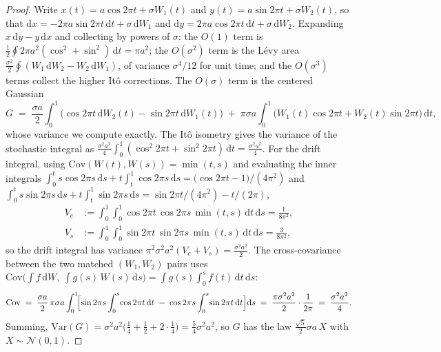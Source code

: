 \documentclass[11pt,a4paper]{article}
\theoremstyle{plain}
\theoremstyle{definition}
\theoremstyle{remark}
\begin{document}
\begin{proof}
Write $x(t)=a\cos 2\pi t+\sigma W_1(t)$ and $y(t)=a\sin 2\pi
t+\sigma W_2(t)$, so that $\mathrm{d}x=-2\pi a\sin 2\pi t\,
\mathrm{d}t+\sigma\,\mathrm{d}W_1$ and $\mathrm{d}y=2\pi a\cos
2\pi t\,\mathrm{d}t+\sigma\,\mathrm{d}W_2$. Expanding
$x\,\mathrm{d}y-y\,\mathrm{d}x$ and collecting by powers of
$\sigma$: the $O(1)$ term is
$\tfrac12\oint 2\pi a^{2}(\cos^{2}+\sin^{2})\,\mathrm{d}t=\pi
a^{2}$; the $O(\sigma^{2})$ term is the L\'evy area
$\tfrac{\sigma^{2}}{2}\oint(W_1\,\mathrm{d}W_2-W_2\,\mathrm{d}W_1)
$, of variance $\sigma^{4}/12$ for unit time; and the
$O(\sigma^{3})$ terms collect the higher It\^o corrections. The
$O(\sigma)$ term is the centered Gaussian
\[
  G \;=\; \frac{\sigma a}{2}\int_0^1\!\bigl(\cos 2\pi t\,
  \mathrm{d}W_2(t)-\sin 2\pi t\,\mathrm{d}W_1(t)\bigr)
  \;+\;\pi\sigma a\int_0^1\!\bigl(W_1(t)\cos 2\pi t+W_2(t)
  \sin 2\pi t\bigr)\,\mathrm{d}t,
\]
whose variance we compute exactly. The It\^o isometry gives the
variance of the stochastic integral as
$\tfrac{\sigma^{2}a^{2}}{4}\int_0^1(\cos^{2}2\pi t+\sin^{2}2\pi
t)\,\mathrm{d}t=\tfrac{\sigma^{2}a^{2}}{4}$. For the drift
integral, using $\mathrm{Cov}(W(t),W(s))=\min(t,s)$ and evaluating
the inner integrals $\int_0^t s\cos 2\pi s\,\mathrm{d}s
+t\int_t^1\cos 2\pi s\,\mathrm{d}s=\bigl(\cos 2\pi t-1\bigr)/
(4\pi^{2})$ and $\int_0^t s\sin 2\pi s\,\mathrm{d}s
+t\int_t^1\sin 2\pi s\,\mathrm{d}s=\sin 2\pi t/(4\pi^{2})-t/(2\pi)
$,
\[
\begin{aligned}
  V_c &:= \int_0^1\!\!\int_0^1\cos 2\pi t\,\cos 2\pi s\,
  \min(t,s)\,\mathrm{d}t\,\mathrm{d}s = \frac{1}{8\pi^{2}},\\
  V_s &:= \int_0^1\!\!\int_0^1\sin 2\pi t\,\sin 2\pi s\,
  \min(t,s)\,\mathrm{d}t\,\mathrm{d}s = \frac{3}{8\pi^{2}},
\end{aligned}
\]
so the drift integral has variance $\pi^{2}\sigma^{2}a^{2}
(V_c+V_s)=\tfrac{\sigma^{2}a^{2}}{2}$. The cross-covariance
between the two matched $(W_1,W_2)$ pairs uses
$\mathrm{Cov}\bigl(\int f\,\mathrm{d}W,\ \int g(s)\,W(s)\,
\mathrm{d}s\bigr)=\int g(s)\int_0^s f(t)\,\mathrm{d}t\,
\mathrm{d}s$:
\[
  \mathrm{Cov} \;=\; \frac{\sigma a}{2}\,\pi\sigma a
  \int_0^1\!\Bigl[\sin 2\pi s\int_0^s\!\cos 2\pi t\,\mathrm{d}t
  \;-\;\cos 2\pi s\int_0^s\!\sin 2\pi t\,\mathrm{d}t\Bigr]
  \mathrm{d}s \;=\; \frac{\pi\sigma^{2}a^{2}}{2}\cdot
  \frac{1}{2\pi} \;=\; \frac{\sigma^{2}a^{2}}{4}.
\]
Summing, $\mathrm{Var}(G)=\sigma^{2}a^{2}
\bigl(\tfrac14+\tfrac12+2\cdot\tfrac14\bigr)
=\tfrac{5}{4}\sigma^{2}a^{2}$, so $G$ has the law
$\tfrac{\sqrt5}{2}\sigma a\,X$ with $X\sim\mathcal N(0,1)$.
\end{proof}
\end{document}
